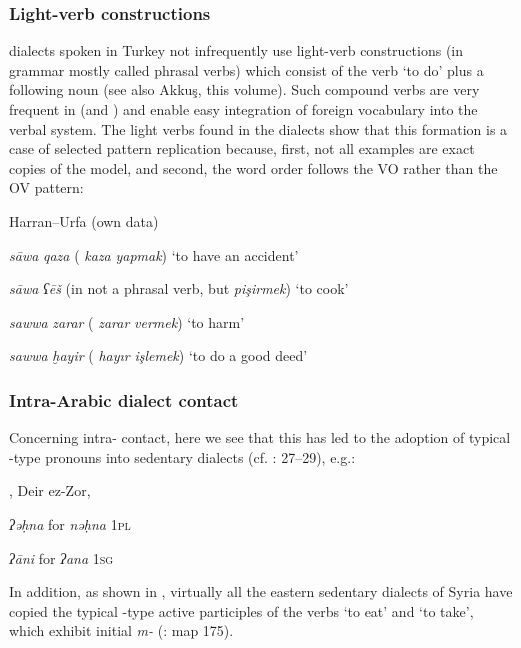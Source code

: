 \documentclass[output=paper]{langsci/langscibook}
\begin{document}
\subsubsection{Light-verb constructions}
 dialects spoken in Turkey not infrequently use light-verb constructions (in  grammar mostly called phrasal verbs) which consist of the verb ‘to do’ plus a following noun (see also Akkuş, this volume). Such compound verbs are very frequent in  (and ) and enable easy integration of foreign vocabulary into the verbal system. The {light verbs} found in the  dialects show that this {formation} is a case of selected pattern {replication} because, first, not all examples are exact copies of the  model, and second, the {word order} follows the  VO rather than the  OV pattern:

\ea
Harran--Urfa (own data)

\textit{sāwa} \textit{qaza} ( \textit{kaza} \textit{yapmak}) ‘to have an accident’

\textit{sāwa} \textit{ʕēš} (in  not a phrasal verb, but \textit{pişirmek}) ‘to cook’
\ex 
{}  \citep[198]{Procházka2002Cukurova} 

\textit{sawwa} \textit{zarar} ( \textit{zarar} \textit{vermek}) ‘to harm’

\textit{sawwa} \textit{ḫayir} ( \textit{hayır} \textit{işlemek}) ‘to do a good deed’
\z

\subsubsection{Intra-Arabic dialect contact}
Concerning intra- contact, here we see that this has led to the adoption of typical -type pronouns into sedentary dialects (cf. \citealt{Palva2009}: 27--29), e.g.:

\ea
{}, Deir ez-Zor,  

\textit{ʔəḥna} for \textit{nəḥna} \textsc{1pl}
\ex 
{} 

\textit{ʔāni} for \textit{ʔana} \textsc{1sg}
\z

In addition, as shown in , virtually all the eastern sedentary dialects of Syria have copied the typical -type active participles of the verbs ‘to eat’ and ‘to take’, which exhibit initial \textit{m-} (\citealt{Behnstedt1997}: map 175).
\end{document}
